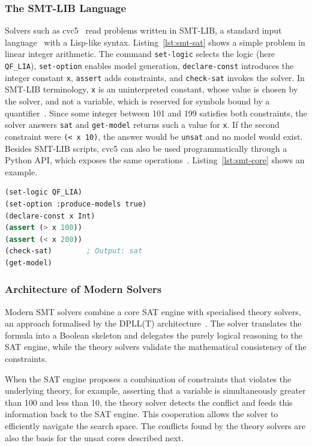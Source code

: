 \subsubsection{The SMT-LIB Language}
Solvers such as cvc5~\cite{barbosa2022cvc5} read problems written in SMT-LIB, a standard input language~\cite{barrett2026smtlib} with a Lisp-like syntax. Listing~\ref{lst:smt-sat} shows a simple problem in linear integer arithmetic. The command \texttt{set-logic} selects the logic (here \texttt{QF\_LIA}), \texttt{set-option} enables model generation, \texttt{declare-const} introduces the integer constant \texttt{x}, \texttt{assert} adds constraints, and \texttt{check-sat} invokes the solver. In SMT-LIB terminology, \texttt{x} is an uninterpreted constant, whose value is chosen by the solver, and not a variable, which is reserved for symbols bound by a quantifier~\cite{barrett2024tutorial}. Since some integer between 101 and 199 satisfies both constraints, the solver answers \texttt{sat} and \texttt{get-model} returns such a value for \texttt{x}. If the second constraint were \texttt{(< x 10)}, the answer would be \texttt{unsat} and no model would exist. Besides SMT-LIB scripts, cvc5 can also be used programmatically through a Python API, which exposes the same operations~\cite{barbosa2022cvc5}. Listing~\ref{lst:smt-core} shows an example.

\begin{lstlisting}[language=Lisp, caption={A satisfiable SMT-LIB script for quantifier-free linear integer arithmetic.}, label={lst:smt-sat}]
(set-logic QF_LIA)
(set-option :produce-models true)
(declare-const x Int)
(assert (> x 100))
(assert (< x 200))
(check-sat)        ; Output: sat
(get-model)
\end{lstlisting}

\subsubsection{Architecture of Modern Solvers}
Modern SMT solvers combine a core SAT engine with specialised theory solvers, an approach formalised by the DPLL(T) architecture~\cite{nieuwenhuis2006dpllt,barrett2018smt}. The solver translates the formula into a Boolean skeleton and delegates the purely logical reasoning to the SAT engine, while the theory solvers validate the mathematical consistency of the constraints. 

When the SAT engine proposes a combination of constraints that violates the underlying theory, for example, asserting that a variable is simultaneously greater than 100 and less than 10, the theory solver detects the conflict and feeds this information back to the SAT engine. This cooperation allows the solver to efficiently navigate the search space. 
The conflicts found by the theory solvers are also the basis for the unsat cores described next.

